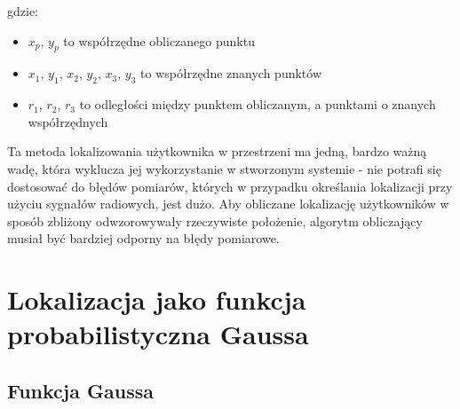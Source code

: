 gdzie:
\begin{itemize}
	\item $x_p$, $y_p$ to współrzędne obliczanego punktu
	\item $x_1$, $y_1$, $x_2$, $y_2$, $x_3$, $y_3$ to współrzędne znanych punktów
	\item $r_1$, $r_2$, $r_3$ to odległości między punktem obliczanym, a punktami o znanych współrzędnych
\end{itemize}
Ta metoda lokalizowania użytkownika w przestrzeni ma jedną, bardzo ważną wadę, która wyklucza jej wykorzystanie w stworzonym systemie - nie potrafi się dostosować do błędów pomiarów, których w przypadku określania lokalizacji przy użyciu sygnałów radiowych, jest dużo. Aby obliczane lokalizację użytkowników w sposób zbliżony odwzorowywały rzeczywiste położenie, algorytm obliczający musiał być bardziej odporny na błędy pomiarowe.
\section{Lokalizacja jako funkcja probabilistyczna Gaussa}
\subsection{Funkcja Gaussa}